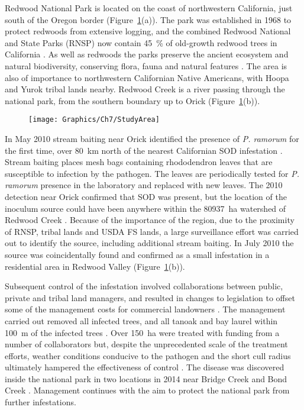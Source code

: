 Redwood National Park is located on the coast of northwestern California, just south of the Oregon border (Figure~\ref{fig:ch7:map}(a)). The park was established in 1968 to protect redwoods from extensive logging, and the combined Redwood National and State Parks (RNSP) now contain \SI{45}{\percent} of old-growth redwood trees in California \citep{rnsp_website}. As well as redwoods the parks preserve the ancient ecosystem and natural biodiversity, conserving flora, fauna and natural features \citep{rnsp_website}. The area is also of importance to northwestern Californian Native Americans, with Hoopa and Yurok tribal lands nearby. Redwood Creek is a river passing through the national park, from the southern boundary up to Orick (Figure~\ref{fig:ch7:map}(b)).

\begin{figure}
    \begin{center}
        \texttt{[image: Graphics/Ch7/StudyArea]}
        \caption[Redwood Creek study ares and SOD outbreak]{\label{fig:ch7:map}}
    \end{center}
\end{figure}

In May 2010 stream baiting near Orick identified the presence of \emph{P. ramorum} for the first time, over \SI{80}{\km} north of the nearest Californian SOD infestation \citep{valachovic_novel_2013}. Stream baiting places mesh bags containing rhododendron leaves that are susceptible to infection by the pathogen. The leaves are periodically tested for \emph{P. ramorum} presence in the laboratory and replaced with new leaves. The 2010 detection near Orick confirmed that SOD was present, but the location of the inoculum source could have been anywhere within the \SI{80937}{\hectare} watershed of Redwood Creek \citep{valachovic_novel_2013}. Because of the importance of the region, due to the proximity of RNSP, tribal lands and USDA FS lands, a large surveillance effort was carried out to identify the source, including additional stream baiting. In July 2010 the source was coincidentally found and confirmed as a small infestation in a residential area in Redwood Valley (Figure~\ref{fig:ch7:map}(b))\citep{valachovic_novel_2013}.

Subsequent control of the infestation involved collaborations between public, private and tribal land managers, and resulted in changes to legislation to offset some of the management costs for commercial landowners \citep{valachovic_novel_2013}. The management carried out removed all infected trees, and all tanoak and bay laurel within \SI{100}{\meter} of the infected trees \citep{valachovic_novel_2013}. Over \SI{150}{\hectare} were treated with funding from a number of collaborators but, despite the unprecedented scale of the treatment efforts, weather conditions conducive to the pathogen and the short cull radius ultimately hampered the effectiveness of control \citep{valachovic_novel_2013}. The disease was discovered inside the national park in two locations in 2014 near Bridge Creek and Bond Creek \citep{stark_sudden_2014}. Management continues with the aim to protect the national park from further infestations.

